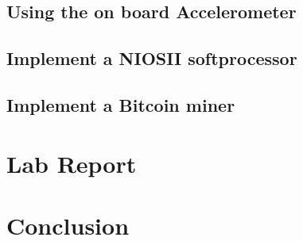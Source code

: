     \subsection{Using the on board Accelerometer}
    \subsection{Implement a NIOSII softprocessor}
    \subsection{Implement a Bitcoin miner}
  \section{\bfseries  Lab Report}
    
  \section{\bfseries  Conclusion}
   
